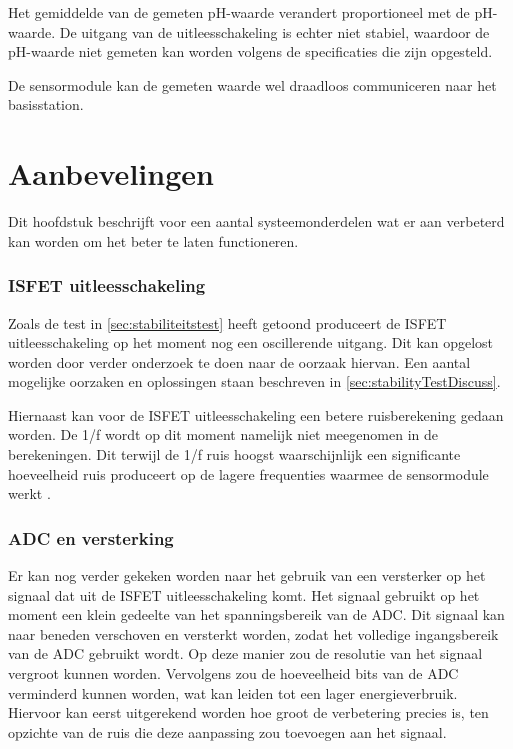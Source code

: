 Het gemiddelde van de gemeten pH-waarde verandert proportioneel met de pH-waarde. De uitgang van de uitleesschakeling is echter niet stabiel, waardoor de pH-waarde niet gemeten kan worden volgens de specificaties die zijn opgesteld.

De sensormodule kan de gemeten waarde wel draadloos communiceren naar het basisstation.



\newpage
\section{Aanbevelingen}
Dit hoofdstuk beschrijft voor een aantal systeemonderdelen wat er aan verbeterd kan worden om het beter te laten functioneren.

\subsubsection*{ISFET uitleesschakeling}
Zoals de test in \cref{sec:stabiliteitstest} heeft getoond produceert de ISFET uitleesschakeling op het moment nog een oscillerende uitgang. Dit kan opgelost worden door verder onderzoek te doen naar de oorzaak hiervan. Een aantal mogelijke oorzaken en oplossingen staan beschreven in \cref{sec:stabilityTestDiscuss}.

Hiernaast kan voor de ISFET uitleesschakeling een betere ruisberekening gedaan worden. De 1/f wordt op dit moment namelijk niet meegenomen in de berekeningen. Dit terwijl de 1/f ruis hoogst waarschijnlijk een significante hoeveelheid ruis produceert op de lagere frequenties waarmee de sensormodule werkt \cite{verhoeven2007structured}.

\subsubsection*{ADC en versterking}
Er kan nog verder gekeken worden naar het gebruik van een versterker op het signaal dat uit de ISFET uitleesschakeling komt. Het signaal gebruikt op het moment een klein gedeelte van het spanningsbereik van de ADC. Dit signaal kan naar beneden verschoven en versterkt worden, zodat het volledige ingangsbereik van de ADC gebruikt wordt. Op deze manier zou de resolutie van het signaal vergroot kunnen worden. Vervolgens zou de hoeveelheid bits van de ADC verminderd kunnen worden, wat kan leiden tot een lager energieverbruik.
Hiervoor kan eerst uitgerekend worden hoe groot de verbetering precies is, ten opzichte van de ruis die deze aanpassing zou toevoegen aan het signaal.

